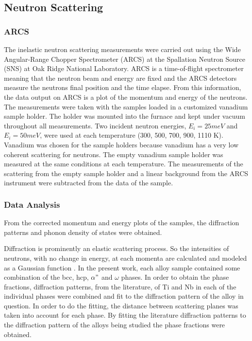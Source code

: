 \subsection{Neutron Scattering}

\subsubsection{ARCS}

The inelastic neutron scattering measurements were carried out using the Wide Angular-Range Chopper Spectrometer (ARCS) at the Spallation Neutron Source (SNS) at Oak Ridge National Laboratory. ARCS is a time-of-flight spectrometer meaning that the neutron beam and energy are fixed and the ARCS detectors measure the neutrons final position and the time elapse. From this information, the data output on ARCS is a plot of the momentum and energy of the neutrons. The measurements were taken with the samples loaded in a customized vanadium sample holder. The holder was mounted into the furnace and kept under vacuum throughout all measurements. Two incident neutron energies, $E_{i} = 25 meV$ and $E_{i} = 50 meV$, were used at each temperature (300, 500, 700, 900, 1110 K). Vanadium was chosen for the sample holders because vanadium has a very low coherent scattering for neutrons. The empty vanadium sample holder was measured at the same conditions at each temperature. The measurements of the scattering from the empty sample holder and a linear background from the ARCS instrument were subtracted from the data of the sample. 

\subsubsection{Data Analysis}

From the corrected momentum and energy plots of the samples, the diffraction patterns and phonon density of states were obtained.

Diffraction is prominently an elastic scattering process. So the intensities of neutrons, with no change in energy, at each momenta are calculated and modeled as a Gaussian function \cite{Young1998,Toraya1986}. In the present work, each alloy sample contained some combination of the bcc, hcp, $\alpha"$ and $\omega$ phases. In order to obtain the phase fractions, diffraction patterns, from the literature, of Ti and Nb in each of the individual phases were combined and fit to the diffraction pattern of the alloy in question. In order to do the fitting, the distance between scattering planes was taken into account for each phase. By fitting the literature diffraction patterns to the diffraction pattern of the alloys being studied the phase fractions were obtained. 

